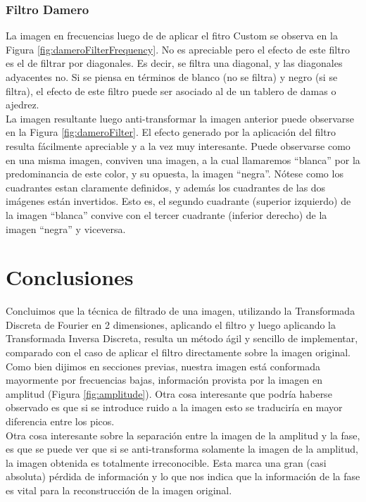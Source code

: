 \documentclass[twocolumn,a4paper,10pt]{article}
\begin{document}
\subsubsection{Filtro Damero}

La imagen en frecuencias luego de de aplicar el fitro Custom se observa en la Figura \ref{fig:dameroFilterFrequency}. No es apreciable pero el efecto de este 
filtro es el de filtrar por diagonales. Es decir, se filtra una diagonal, y las diagonales adyacentes no. Si se piensa en t\'erminos de blanco (no se filtra) y 
negro (si se filtra), el efecto de este filtro puede ser asociado al de un tablero de damas o ajedrez.\\

La imagen resultante luego anti-transformar la imagen anterior puede observarse en la Figura \ref{fig:dameroFilter}. El efecto generado por la aplicaci\'on del 
filtro resulta f\'acilmente apreciable y a la vez muy interesante. Puede observarse como en una misma imagen, conviven una imagen, a la cual llamaremos ``blanca''
por la predominancia de este color, y su opuesta, la imagen ``negra''. 
N\'otese como los cuadrantes estan claramente definidos, y además los cuadrantes de las dos im\'agenes est\'an invertidos. Esto es, el 
segundo cuadrante (superior izquierdo) de la imagen ``blanca'' convive con el tercer cuadrante (inferior derecho) de la imagen ``negra'' y viceversa. 

\section{Conclusiones}
\label{sec:conclusiones}

Concluimos que la t\'ecnica de filtrado de una imagen, utilizando la Transformada Discreta de Fourier en 2 dimensiones, aplicando el filtro y luego aplicando la
Transformada Inversa Discreta, resulta un m\'etodo \'agil y sencillo de implementar, comparado con el caso de aplicar el filtro directamente sobre la imagen 
original. \\

Como bien dijimos en secciones previas, nuestra imagen está conformada mayormente por frecuencias bajas, informaci\'on provista por la imagen en amplitud 
(Figura \ref{fig:amplitude}). Otra cosa interesante que podría haberse observado es que si se introduce ruido a la imagen esto se traducir\'ia en mayor 
diferencia entre los picos\cite{HIPR2-FourierTransform}. \\

Otra cosa interesante sobre la separaci\'on entre la imagen de la amplitud y la fase, es que se puede ver que si se anti-transforma solamente la imagen de la 
amplitud, la imagen obtenida es totalmente irreconocible. Esta marca una gran (casi absoluta) p\'erdida de informaci\'on y lo que nos indica que la informaci\'on
de la fase es vital para la reconstrucci\'on de la imagen original.\\
\end{document}
